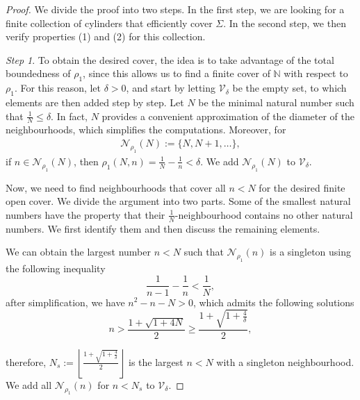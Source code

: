 \documentclass[11pt, reqno]{amsart}
\theoremstyle{plain}%
\theoremstyle{definition}
\theoremstyle{definition}
\def\N{\ensuremath{\mathbb N}}
\def\st{such that }
\numberwithin{equation}{section}
\begin{document}
\begin{proof}
    
We divide the proof into two steps. In the first step, we are looking for a finite collection of cylinders that efficiently cover $\Sigma$. In the second step, we then verify properties (1) and (2) for this collection. 


\textit{Step 1}. To obtain the desired cover, the idea is to take advantage of the total boundedness of $\rho_1$, since this allows us to find a finite cover of $\N$ with respect to $\rho_1$. For this reason, let $\delta> 0$, and start by letting $\mathcal{V}_\delta$ be the empty set, to which elements are then added step by step. Let $N$ be the minimal natural number  \st $\frac{1}{N}\le \delta$. In fact, $N$ provides a convenient approximation of the diameter of the neighbourhoods, which simplifies the computations. Moreover, for
\begin{align}\label{Countable set of N}
    \mathcal{N}_{\rho_1}(N):=\{N,N+1,\ldots\},
\end{align}
if $n\in\mathcal{N}_{\rho_1}(N)$, then ${\rho_1}(N,n)=\frac{1}{N}-\frac{1}{n}<\delta$. We add $\mathcal{N}_{\rho_1}(N)$ to $\mathcal{V}_\delta$.

 Now, we need to find neighbourhoods that cover all $n<N$ for the desired finite open cover. We divide the argument into two parts. Some of the smallest natural numbers have the property that their $\frac{1}{N}$-neighbourhood contains no other natural numbers. We first identify them and then discuss the remaining elements.
 
We can obtain the largest number $n<N$ \st $\mathcal{N}_{\rho_1}(n)$ is a singleton using the following inequality 
$$\frac{1}{n-1}-\frac{1}{n}<\frac{1}{N},$$
after simplification, we have
$n^2-n-N>0$, which admits the following solutions
$$n>\frac{1+ \sqrt{1+4N}}{2}\ge \frac{1+ \sqrt{1+\frac{4}{\delta}}}{2},$$

therefore, $N_s:=\left\lfloor\frac{1+ \sqrt{1+\frac{4}{\delta}}}{2}\right\rfloor$ is the largest $n<N$ with a singleton neighbourhood. We add all $\mathcal{N}_{\rho_1}(n)$ for $n<N_s$ to $\mathcal{V}_\delta$.


\end{proof}
\end{document}
